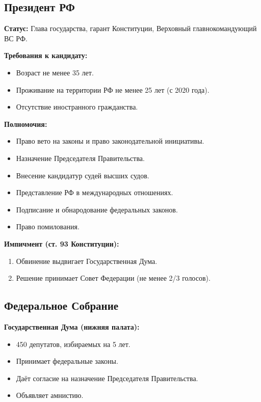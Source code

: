 \documentclass[12pt]{article}
\begin{document}
	\subsection{Президент РФ}
	
	\textbf{Статус:} Глава государства, гарант Конституции, Верховный главнокомандующий ВС РФ.
	
	\noindent \textbf{Требования к кандидату:}
	\begin{itemize}
		\item Возраст не менее 35 лет.
		\item Проживание на территории РФ не менее 25 лет (с 2020 года).
		\item Отсутствие иностранного гражданства.
	\end{itemize}
	
	\noindent \textbf{Полномочия:}
	\begin{itemize}
		\item Право вето на законы и право законодательной инициативы.
		\item Назначение Председателя Правительства.
		\item Внесение кандидатур судей высших судов.
		\item Представление РФ в международных отношениях.
		\item Подписание и обнародование федеральных законов.
		\item Право помилования.
	\end{itemize}
	
	\noindent \textbf{Импичмент (ст. 93 Конституции):}
	\begin{enumerate}
		\item Обвинение выдвигает Государственная Дума.
		\item Решение принимает Совет Федерации (не менее 2/3 голосов).
	\end{enumerate}
	
	\subsection{Федеральное Собрание}
	
	\textbf{Государственная Дума (нижняя палата):}
	\begin{itemize}
		\item 450 депутатов, избираемых на 5 лет.
		\item Принимает федеральные законы.
		\item Даёт согласие на назначение Председателя Правительства.
		\item Объявляет амнистию.
	\end{itemize}
	
\end{document}
